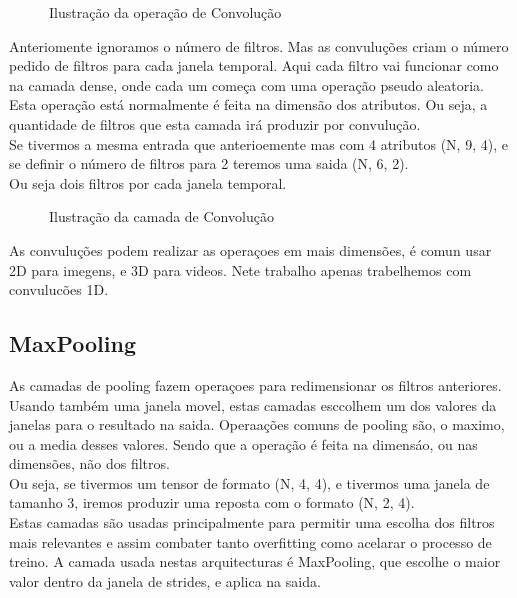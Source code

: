 \begin{figure}[H]
	\centering
	\resizebox{\linewidth}{!}{}
	\caption{Ilustração da operação de Convolução}
	\label{fig:conv_layer1D}
\end{figure}

Anteriomente ignoramos o número de filtros. Mas as convuluções criam o número pedido de filtros para cada janela temporal. Aqui cada filtro vai funcionar como na camada dense, onde cada um começa com uma operação pseudo aleatoria. Esta operação está normalmente é feita na dimensão dos atributos. Ou seja, a quantidade de filtros que esta camada irá produzir por convulução. \\
Se tivermos a mesma entrada que anterioemente mas com 4 atributos (N, 9, 4), e se definir o número de filtros para 2 teremos uma saida (N, 6, 2). \\
Ou seja dois filtros por cada janela temporal. 


\begin{figure}[H]
	\centering
	\resizebox{\linewidth}{!}{}
	\caption{Ilustração da camada de Convolução}
	\label{fig:conv_layer}
\end{figure}

As convuluções podem realizar as operaçoes em mais dimensões, é comun usar 2D para imegens, e 3D para videos. Nete trabalho apenas trabelhemos com convulucões 1D.\\


\subsection{MaxPooling\label{se:max_pooling}}

As camadas de pooling fazem operaçoes para redimensionar os filtros anteriores. \\
Usando também uma janela movel, estas camadas esccolhem um dos valores da janelas para o resultado na saida. Operaações comuns de pooling são, o maximo, ou a media desses valores. Sendo que a operação é feita na dimensáo, ou nas dimensões, não dos filtros. \\
Ou seja, se tivermos um tensor de formato (N, 4, 4), e tivermos uma janela de tamanho 3, iremos produzir uma reposta com o formato (N, 2, 4).\\
Estas camadas são usadas principalmente para permitir uma escolha dos filtros mais relevantes e assim combater tanto overfitting como acelarar o processo de treino. \cite{Matoba2022}
A camada usada nestas arquitecturas é MaxPooling, que escolhe o maior valor dentro da janela de strides, e aplica na saida. \\

